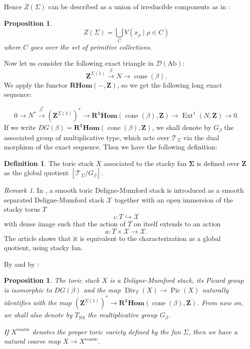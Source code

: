 \documentclass{proc-l}
\newcommand{\Z}{\mathbf{Z}}
\DeclareMathOperator{\Pic}{Pic}
\DeclareMathOperator{\Div}{Div}
\DeclareMathOperator{\Ext}{Ext}
\DeclareMathOperator{\coneform}{cone}
\DeclareMathOperator{\NS}{NS}
\DeclareMathOperator{\coarse}{coarse}
\newcommand{\stackX}{\mathcal{X}}
\newcommand{\stackT}{\mathcal{T}}
\newcommand{\RHom}{\mathbf{R Hom}}
\newtheorem{prop}[theorem]{Proposition}
\theoremstyle{definition}
\newtheorem{definition}[theorem]{Definition}
\theoremstyle{remark}
\newtheorem{remark}[theorem]{Remark}
\numberwithin{equation}{section}
\begin{document}
Hence $Z(\Sigma)$ can be described as a union of irreducible components as in \cite[proposition 5.1.6]{CoxLittleSchenck2011}:
\begin{prop}\label{description_torseur_univ_primitive_collection}
    $$Z(\Sigma) = \bigcup\limits_{C} V( x_{\rho} \mid \rho \in C ) $$where $C$ goes over the set of primitive collections.
\end{prop}

Now let us consider the following exact triangle in $\mathcal{D}(\text{Ab})$:
$$ \Z^{\Sigma(1)} \xrightarrow{\beta} N \rightarrow \coneform(\beta) .$$ We apply the functor $\RHom(-,\Z)$, so we get the following long exact sequence:

$$ 0 \rightarrow N^* \xrightarrow{\beta^*} (\Z^{\Sigma(1)})^* \rightarrow \mathbf{R^1 Hom}(\coneform(\beta),\Z) \rightarrow \Ext^1(N,\Z) \rightarrow 0 .$$If we write $DG(\beta) = \mathbf{R^1 Hom}(\coneform(\beta),\Z)$, we shall denote by $G_{\beta}$ the associated group of multiplicative type, which acts over $\stackT_{\Sigma}$ via the dual morphism of the exact sequence. Then we have the following definition:

\begin{definition}
    The toric stack $X$ associated to the stacky fan $\mathbf{\Sigma}$ is defined over $\Z$ as the global quotient $[\stackT_{\Sigma} / G_{\beta} ]$. 
\end{definition}

\begin{remark}
    In \cite[definition 3.1]{fantechi_toric_stack}, a smooth toric Deligne-Mumford stack is introduced as a smooth separated Deligne-Mumford stack $\stackX$ together with an open immersion of the stacky torus $T$ $$\iota : T \hookrightarrow \stackX$$with dense image such that the action of $T$ on itself extends to an action $$a : T \times \stackX \rightarrow \stackX.$$The article \cite{fantechi_toric_stack} shows that it is equivalent to the characterization as a global quotient, using stacky fan.
\end{remark}

By \cite[proposition 3.2, 3.7]{borisov_toric_stack} and by \cite[section 7]{fantechi_toric_stack}:

\begin{prop}
    The toric stack $X$ is a Deligne-Mumford stack, its Picard group is isomorphic to $DG(\beta)$ and the map $\Div_T(X) \rightarrow \Pic(X)$ naturally identifies with the map $(\Z^{\Sigma(1)})^* \rightarrow \mathbf{R^1 Hom}(\coneform(\beta),\Z)$. From now on, we shall also denote by $T_{\NS}$ the multiplicative group $G_{\beta}$.

    If $X^{\coarse}$ denotes the proper toric variety defined by the fan $\Sigma$, then we have a natural coarse map $X \rightarrow X^{\coarse}$. 
\end{prop}
\end{document}
